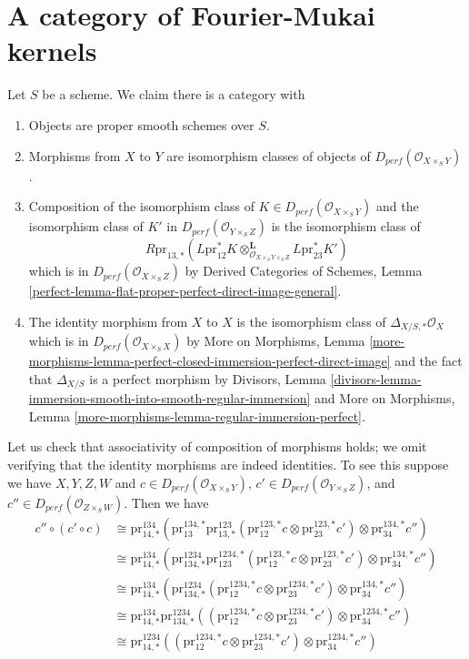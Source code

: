 \section{A category of Fourier-Mukai kernels}
\label{equiv-section-category-Fourier-Mukai-kernels}
Let $S$ be a scheme. We claim there is a category
with
\begin{enumerate}
\item Objects are proper smooth schemes over $S$.
\item Morphisms from $X$ to $Y$ are isomorphism classes
of objects of $D_{perf}(\mathcal{O}_{X \times_S Y})$.
\item Composition of the isomorphism class of
$K \in D_{perf}(\mathcal{O}_{X \times_S Y})$
and the isomorphism class of $K'$ in $D_{perf}(\mathcal{O}_{Y \times_S Z})$
is the isomorphism class of
$$
R\text{pr}_{13, *}(
L\text{pr}_{12}^*K
\otimes_{\mathcal{O}_{X \times_S Y \times_S Z}}^\mathbf{L}
L\text{pr}_{23}^*K')
$$
which is in $D_{perf}(\mathcal{O}_{X \times_S Z})$ by
Derived Categories of Schemes, Lemma
\ref{perfect-lemma-flat-proper-perfect-direct-image-general}.
\item The identity morphism from $X$ to $X$ is the
isomorphism class of $\Delta_{X/S, *}\mathcal{O}_X$
which is in $D_{perf}(\mathcal{O}_{X \times_S X})$
by More on Morphisms, Lemma
\ref{more-morphisms-lemma-perfect-closed-immersion-perfect-direct-image}
and the fact that $\Delta_{X/S}$ is a perfect morphism by
Divisors, Lemma
\ref{divisors-lemma-immersion-smooth-into-smooth-regular-immersion} and
More on Morphisms, Lemma \ref{more-morphisms-lemma-regular-immersion-perfect}.
\end{enumerate}
Let us check that associativity of composition
of morphisms holds; we omit verifying that the identity
morphisms are indeed identities. To see this suppose we have
$X, Y, Z, W$ and
$c \in D_{perf}(\mathcal{O}_{X \times_S Y})$,
$c' \in D_{perf}(\mathcal{O}_{Y \times_S Z})$, and
$c'' \in D_{perf}(\mathcal{O}_{Z \times_S W})$. Then we have
\begin{align*}
c'' \circ (c' \circ c)
& \cong
\text{pr}^{134}_{14, *}(
\text{pr}^{134, *}_{13}
\text{pr}^{123}_{13, *}(\text{pr}^{123, *}_{12}c \otimes
\text{pr}^{123, *}_{23}c')
\otimes \text{pr}^{134, *}_{34}c'') \\
& \cong
\text{pr}^{134}_{14, *}(
\text{pr}^{1234}_{134, *}
\text{pr}^{1234, *}_{123}(\text{pr}^{123, *}_{12}c \otimes
\text{pr}^{123, *}_{23}c')
\otimes \text{pr}^{134, *}_{34}c'') \\
& \cong
\text{pr}^{134}_{14, *}(
\text{pr}^{1234}_{134, *}
(\text{pr}^{1234, *}_{12}c \otimes
\text{pr}^{1234, *}_{23}c')
\otimes \text{pr}^{134, *}_{34}c'') \\
& \cong
\text{pr}^{134}_{14, *}
\text{pr}^{1234}_{134, *}
((\text{pr}^{1234, *}_{12}c \otimes
\text{pr}^{1234, *}_{23}c')
\otimes \text{pr}^{1234, *}_{34}c'') \\
& \cong
\text{pr}^{1234}_{14, *}(
(\text{pr}^{1234, *}_{12}c \otimes
\text{pr}^{1234, *}_{23}c') \otimes
\text{pr}^{1234, *}_{34}c'')
\end{align*}
